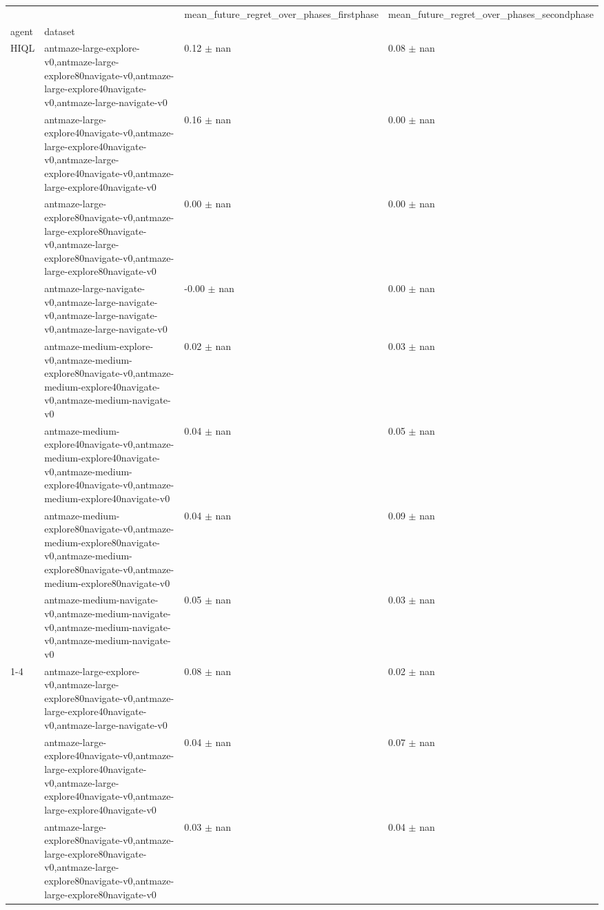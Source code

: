 \begin{tabular}{llll}
\toprule
 &  & mean_future_regret_over_phases_firstphase & mean_future_regret_over_phases_secondphase \\
agent & dataset &  &  \\
\midrule
\multirow[t]{8}{*}{HIQL} & antmaze-large-explore-v0,antmaze-large-explore80navigate-v0,antmaze-large-explore40navigate-v0,antmaze-large-navigate-v0 & 0.12 $\pm$ nan & 0.08 $\pm$ nan \\
 & antmaze-large-explore40navigate-v0,antmaze-large-explore40navigate-v0,antmaze-large-explore40navigate-v0,antmaze-large-explore40navigate-v0 & 0.16 $\pm$ nan & 0.00 $\pm$ nan \\
 & antmaze-large-explore80navigate-v0,antmaze-large-explore80navigate-v0,antmaze-large-explore80navigate-v0,antmaze-large-explore80navigate-v0 & 0.00 $\pm$ nan & 0.00 $\pm$ nan \\
 & antmaze-large-navigate-v0,antmaze-large-navigate-v0,antmaze-large-navigate-v0,antmaze-large-navigate-v0 & -0.00 $\pm$ nan & 0.00 $\pm$ nan \\
 & antmaze-medium-explore-v0,antmaze-medium-explore80navigate-v0,antmaze-medium-explore40navigate-v0,antmaze-medium-navigate-v0 & 0.02 $\pm$ nan & 0.03 $\pm$ nan \\
 & antmaze-medium-explore40navigate-v0,antmaze-medium-explore40navigate-v0,antmaze-medium-explore40navigate-v0,antmaze-medium-explore40navigate-v0 & 0.04 $\pm$ nan & 0.05 $\pm$ nan \\
 & antmaze-medium-explore80navigate-v0,antmaze-medium-explore80navigate-v0,antmaze-medium-explore80navigate-v0,antmaze-medium-explore80navigate-v0 & 0.04 $\pm$ nan & 0.09 $\pm$ nan \\
 & antmaze-medium-navigate-v0,antmaze-medium-navigate-v0,antmaze-medium-navigate-v0,antmaze-medium-navigate-v0 & 0.05 $\pm$ nan & 0.03 $\pm$ nan \\
\cline{1-4}
\multirow[t]{8}{*}{QRL} & antmaze-large-explore-v0,antmaze-large-explore80navigate-v0,antmaze-large-explore40navigate-v0,antmaze-large-navigate-v0 & 0.08 $\pm$ nan & 0.02 $\pm$ nan \\
 & antmaze-large-explore40navigate-v0,antmaze-large-explore40navigate-v0,antmaze-large-explore40navigate-v0,antmaze-large-explore40navigate-v0 & 0.04 $\pm$ nan & 0.07 $\pm$ nan \\
 & antmaze-large-explore80navigate-v0,antmaze-large-explore80navigate-v0,antmaze-large-explore80navigate-v0,antmaze-large-explore80navigate-v0 & 0.03 $\pm$ nan & 0.04 $\pm$ nan \\

\end{tabular}
